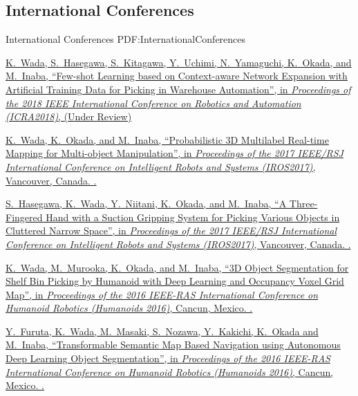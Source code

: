 \documentclass[letterpaper,MMMyyyy,nonstop]{simpleresumecv}
\begin{document}
\begin{body}
\BigGap
\subsection
{International Conferences}
{International Conferences}
{PDF:InternationalConferences}

\GapNoBreak
\NumberedItem{{\CharSpace}[14]}
\href{http://www.icra2018.org/}
{\underline{K.~Wada}, S.~Hasegawa, S.~Kitagawa, Y.~Uchimi, N.~Yamaguchi, K.~Okada, and M.~Inaba,
``Few-shot Learning based on Context-aware Network Expansion with Artificial Training Data for Picking in Warehouse Automation'',
in \textit{Proceedings of the 2018 IEEE International Conference on Robotics and Automation (ICRA2018)}, (Under Review)}

\GapNoBreak
\NumberedItem{{\CharSpace}[9]}
\href{http://www.iros2017.org/}
{\underline{K.~Wada}, K.~Okada, and M.~Inaba,
``Probabilistic 3D Multilabel Real-time Mapping for Multi-object Manipulation'',
in \textit{Proceedings of the 2017 IEEE/RSJ International Conference on Intelligent Robots and Systems (IROS2017)},
Vancouver, Canada.
.}

\GapNoBreak
\NumberedItem{{\CharSpace}[8]}
\href{http://www.iros2017.org/}
{S.~Hasegawa, \underline{K.~Wada}, Y.~Niitani, K.~Okada, and M.~Inaba,
``A Three-Fingered Hand with a Suction Gripping System for Picking Various Objects in Cluttered Narrow Space'',
in \textit{Proceedings of the 2017 IEEE/RSJ International Conference on Intelligent Robots and Systems (IROS2017)},
Vancouver, Canada.
.}

\GapNoBreak
\NumberedItem{{\CharSpace}[6]}
\href{https://ras.papercept.net/conferences/conferences/ICHR16/program/ICHR16_ContentListWeb_2.html}
{\underline{K.~Wada}, M.~Murooka, K.~Okada, and M.~Inaba,
``3D Object Segmentation for Shelf Bin Picking by Humanoid with Deep Learning and Occupancy Voxel Grid Map'',
in \textit{Proceedings of the 2016 IEEE-RAS International Conference on Humanoid Robotics (Humanoids 2016)},
Cancun, Mexico.
.}

\GapNoBreak
\NumberedItem{{\CharSpace}[5]}
\href{https://ras.papercept.net/conferences/conferences/ICHR16/program/ICHR16_ContentListWeb_1.html}
{Y.~Furuta, \underline{K.~Wada}, M.~Masaki, S.~Nozawa, Y.~Kakichi, K.~Okada and M.~Inaba,
``Transformable Semantic Map Based Navigation using Autonomous Deep Learning Object Segmentation'',
in \textit{Proceedings of the 2016 IEEE-RAS International Conference on Humanoid Robotics (Humanoids 2016)},
Cancun, Mexico.
.}


\end{body}
\end{document}
